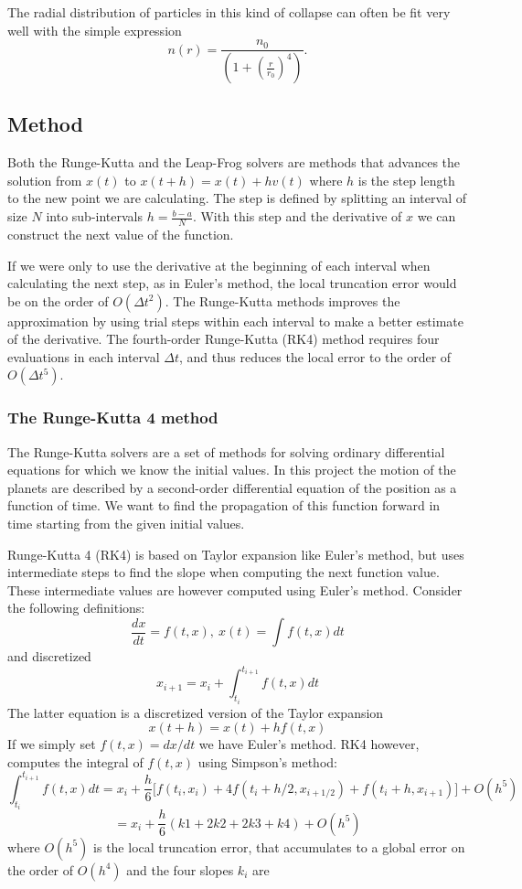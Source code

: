 \documentclass[a4paper,12pt, english]{article}
\begin{document}
The radial distribution of particles in this kind of collapse can often be fit very well with the simple expression
\[
n(r) = \frac{n_0}{\left(1 +\left(\frac{r}{r_0}\right)^4\right)}.
\]

 
\subsection*{Method}

Both the Runge-Kutta and the Leap-Frog solvers are methods that advances the solution from $x(t)$ to $x(t+h) = x(t) + hv(t)$ where $h$ is the step length to the new point we are calculating. The step is defined by splitting an interval of size $N$ into sub-intervals $h = \frac{b-a}{N}$. With this step and the derivative of $x$ we can construct the next value of the function.

If we were only to use the derivative at the beginning of each interval when calculating the next step, as in Euler's method, the local truncation error would be on the order of $O(\Delta t^2)$. The Runge-Kutta methods improves the approximation by using trial steps within each interval to make a better estimate of the derivative. The fourth-order Runge-Kutta (RK4) method requires four evaluations in each interval $\Delta t$, and thus reduces the local error to the order of $O(\Delta t^5)$.

 
\subsubsection*{The Runge-Kutta 4 method}

The Runge-Kutta solvers are a set of methods for solving ordinary differential equations for which we know the initial values. In this project the motion of the planets are described by a second-order differential equation of the position as a function of time. We want to find the propagation of this function forward in time starting from the given initial values.

Runge-Kutta 4 (RK4) is based on Taylor expansion like Euler's method, but uses intermediate steps to find the slope when computing the next function value. These intermediate values are however computed using Euler's method. Consider the following definitions:
\[
\frac{dx}{dt}=f(t,x), \ x(t)=\int f(t,x)dt
\]
and discretized
\[
x_{i+1} = x_i + \int_{t_i}^{t_{i+1}}f(t,x)dt
\]
The latter equation is a discretized version of the Taylor expansion
\[
x(t+h) = x(t) + hf(t,x)
\]
If we simply set $f(t,x) = dx/dt$ we have Euler's method. RK4 however, computes the integral of $f(t,x)$ using Simpson's method:
\[
\int_{t_i}^{t_{i+1}}f(t,x)dt = x_i + \frac{h}{6} \lbrack f(t_i,x_i) + 4f(t_i+h/2,x_{i+1/2}) +
f(t_i+h,x_{i+1}) \rbrack + O(h^5)
\]
\[
= x_i + \frac{h}{6} (k1 + 2k2 + 2k3 + k4) + O(h^5)
\]
where $O(h^5)$ is the local truncation error, that accumulates to a global error on the order of $O(h^4)$ and the four slopes $k_i$ are
\end{document}
